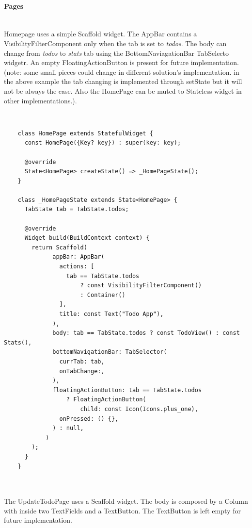 	\mbox{}
	
	
	\paragraph{Pages} \mbox{} \\
	\label{par:pages_todo_app}
Homepage uses a simple Scaffold widget. The AppBar contains a VisibilityFilterComponent only when the tab is set to \textit{todos}. The body can change from \textit{todos} to \textit{stats} tab using the BottomNaviagationBar TabSelecto widgetr. An empty FloatingActionButton is present for future implementation.
	(note: some small pieces could change in different solution’s implementation. in the above example the tab changing is implemented through setState but it will not be always the case. Also the HomePage can be muted to Stateless widget in other implementations.).
	
	\mbox{}\\
	
	 \mbox{}
	\begin{verbatim}
	class HomePage extends StatefulWidget {
	  const HomePage({Key? key}) : super(key: key);
	
	  @override
	  State<HomePage> createState() => _HomePageState();
	}
	
	class _HomePageState extends State<HomePage> {
	  TabState tab = TabState.todos; 
	
	  @override
	  Widget build(BuildContext context) {
	    return Scaffold(
	          appBar: AppBar(
	            actions: [
	              tab == TabState.todos
	                  ? const VisibilityFilterComponent()
	                  : Container()
	            ],
	            title: const Text("Todo App"),
	          ),
	          body: tab == TabState.todos ? const TodoView() : const Stats(),
	          bottomNavigationBar: TabSelector(
	            currTab: tab,
	            onTabChange:,
	          ),
	          floatingActionButton: tab == TabState.todos
	              ? FloatingActionButton(
	                  child: const Icon(Icons.plus_one),
	            onPressed: () {},
	          ) : null,
	        )
	    );
	  }
	}
	
	
	\end{verbatim}
	
	\mbox{}
	
	
	The UpdateTodoPage uses a Scaffold widget. The body is composed by a Column with inside two TextFields and a TextButton. The TextButton is left empty for future implementation.
	
